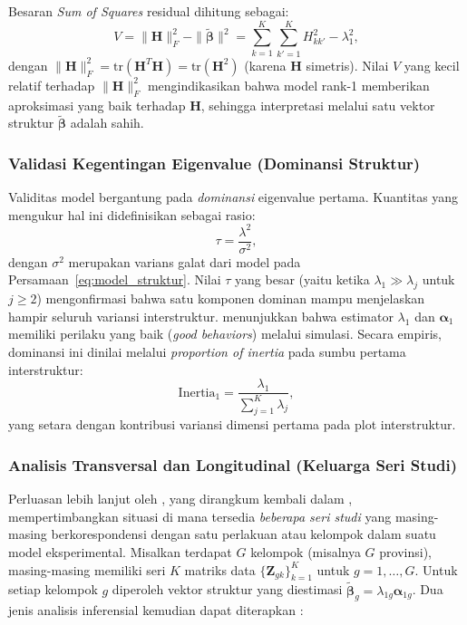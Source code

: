 Besaran \textit{Sum of Squares} residual dihitung sebagai:
\begin{equation}\label{eq:ss_residual}
  V = \|\mathbf{H}\|_F^2 - \|\tilde{\boldsymbol{\beta}}\|^2 = \sum_{k=1}^{K}\sum_{k'=1}^{K} H_{kk'}^2 - \lambda_1^2,
\end{equation}
dengan $\|\mathbf{H}\|_F^2 = \mathrm{tr}(\mathbf{H}^T\mathbf{H}) = \mathrm{tr}(\mathbf{H}^2)$ (karena $\mathbf{H}$ simetris). Nilai $V$ yang kecil relatif terhadap $\|\mathbf{H}\|_F^2$ mengindikasikan bahwa model rank-1 memberikan aproksimasi yang baik terhadap $\mathbf{H}$, sehingga interpretasi melalui satu vektor struktur $\tilde{\boldsymbol{\beta}}$ adalah sahih.

\subsubsection*{Validasi Kegentingan Eigenvalue (Dominansi Struktur)}

Validitas model bergantung pada \textit{dominansi} eigenvalue pertama. Kuantitas yang mengukur hal ini didefinisikan sebagai rasio:
\begin{equation}\label{eq:tau}
  \tau = \frac{\lambda^2}{\sigma^2},
\end{equation}
dengan $\sigma^2$ merupakan varians galat dari model pada Persamaan~\eqref{eq:model_struktur}. Nilai $\tau$ yang besar (yaitu ketika $\lambda_1 \gg \lambda_j$ untuk $j \geq 2$) mengonfirmasi bahwa satu komponen dominan mampu menjelaskan hampir seluruh variansi interstruktur. \citet{areia2008} menunjukkan bahwa estimator $\lambda_1$ dan $\boldsymbol{\alpha}_1$ memiliki perilaku yang baik (\textit{good behaviors}) melalui simulasi. Secara empiris, dominansi ini dinilai melalui \textit{proportion of inertia} pada sumbu pertama interstruktur:
\begin{equation}\label{eq:prop_inertia}
  \mathrm{Inertia}_1 = \frac{\lambda_1}{\displaystyle\sum_{j=1}^{K} \lambda_j},
\end{equation}
yang setara dengan kontribusi variansi dimensi pertama pada plot interstruktur.

\subsubsection*{Analisis Transversal dan Longitudinal (Keluarga Seri Studi)}

Perluasan lebih lanjut oleh \citet{areia2008}, yang dirangkum kembali dalam \citet{oliveira2024}, mempertimbangkan situasi di mana tersedia \textit{beberapa seri studi} yang masing-masing berkorespondensi dengan satu perlakuan atau kelompok dalam suatu model eksperimental. Misalkan terdapat $G$ kelompok (misalnya $G$ provinsi), masing-masing memiliki seri $K$ matriks data $\{\mathbf{Z}_{gk}\}_{k=1}^{K}$ untuk $g=1,\ldots,G$. Untuk setiap kelompok $g$ diperoleh vektor struktur yang diestimasi $\tilde{\boldsymbol{\beta}}_g = \lambda_{1g}\boldsymbol{\alpha}_{1g}$. Dua jenis analisis inferensial kemudian dapat diterapkan \citep{oliveira2024}:

